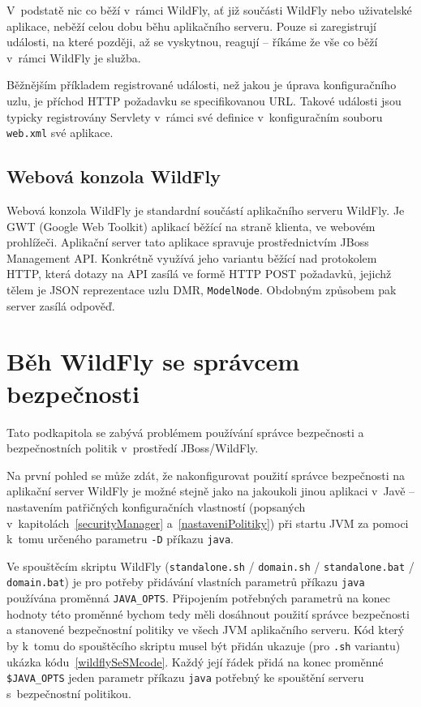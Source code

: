 V~podstatě nic co běží v~rámci WildFly, ať již součásti WildFly nebo uživatelské aplikace, neběží celou dobu běhu aplikačního serveru.
Pouze si zaregistrují události, na které později, až se vyskytnou, reagují -- říkáme že vše co běží v~rámci WildFly je služba.~\cite{jboss7slideShare}

Běžnějším příkladem registrované události, než jakou je úprava konfiguračního uzlu, je příchod HTTP požadavku se specifikovanou URL.
Takové události jsou typicky registrovány Servlety v~rámci své definice v~konfiguračním souboru {\tt web.xml} své aplikace.
\cite{jboss7slideShare}

\subsection{Webová konzola WildFly} \label{hal}

Webová konzola WildFly je standardní součástí aplikačního serveru WildFly.
Je GWT (Google Web Toolkit) aplikací běžící na straně klienta, ve webovém prohlížeči.
Aplikační server tato aplikace spravuje prostřednictvím JBoss Management API.
Konkrétně využívá jeho variantu běžící nad protokolem HTTP, která dotazy na API zasílá ve formě HTTP POST požadavků, jejichž tělem je JSON reprezentace uzlu DMR, {\tt ModelNode}. Obdobným způsobem pak server zasílá odpověď.
\cite{WildFlyManagementAPIreference}

\section{Běh WildFly se správcem bezpečnosti} \label{wildflySeSM}

Tato podkapitola se zabývá problémem používání správce bezpečnosti a bezpečnostních politik v~prostředí JBoss/WildFly.

Na první pohled se může zdát, že nakonfigurovat použití správce bezpečnosti na aplikační server WildFly je možné stejně jako na jakoukoli jinou aplikaci v~Javě -- nastavením patřičných konfiguračních vlastností (popsaných v~kapitolách~\ref{securityManager} a~\ref{nastaveniPolitiky}) při startu JVM za pomoci k~tomu určeného parametru {\tt -D} příkazu {\tt java}.

Ve spouštěcím skriptu WildFly ({\tt standalone.sh} / {\tt domain.sh} / {\tt standalone.bat} / {\tt domain.bat}) je pro potřeby přidávání vlastních parametrů příkazu {\tt java} používána proměnná {\tt JAVA\_OPTS}.
Připojením potřebných parametrů na konec hodnoty této proměnné bychom tedy měli dosáhnout použití správce bezpečnosti a stanovené bezpečnostní politiky ve všech JVM aplikačního serveru.
Kód který by k~tomu do spouštěcího skriptu musel být přidán ukazuje (pro {\tt *.sh} variantu) ukázka kódu~\ref{wildflySeSMcode}.
Každý její řádek přidá na konec proměnné {\tt \$JAVA\_OPTS} jeden parametr příkazu {\tt java} potřebný ke spouštění serveru s~bezpečnostní politikou.
\cite{jbossSecurityManager}

